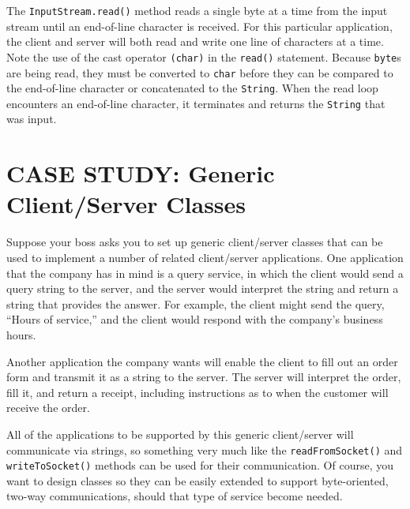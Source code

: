 {The {\tt InputStream.read()} method reads a single byte at a time from
the input stream until an end-of-line character is received.  For this
particular application, the client and server will both read and write
one line of characters at a time.  Note the use of the cast operator
{\tt (char)} in the {\tt read()} statement.   Because {\tt byte}s are
being read, they must be converted to {\tt char} before they can be
compared to the end-of-line character or concatenated to the
{\tt String}. When the read loop encounters an end-of-line character, it
terminates and returns the {\tt String} that was input.


\section{CASE STUDY: Generic Client/Server Classes}
\label{casestudy-generic-client-server-classes}
\label{sec-clientserver}\label{pg-sec-clientserver}
\noindent Suppose your boss asks you to set up generic client/server classes
that can be used to implement a number of related client/server
applications.  One application that the company has in mind is a query
service, in which the client would send a query string to the server,
and the server would interpret the string and return a string that
provides the answer.  For example, the client might send the query,
``Hours of service,'' and the client would respond with the company's
business hours.

Another application the company wants will enable the client to fill out an
order form and transmit it as a string to the server.  The server will
interpret the order, fill it, and return a receipt, including
instructions as to when the customer will receive the order.

All of the applications to be supported by this generic client/server
will communicate via strings, so something very much like the
{\tt readFromSocket()} and {\tt writeToSocket()} methods can be used for
their communication.  Of course, you want to design classes so they
can be easily extended to support byte-oriented, two-way
communications, should that type of service become needed.

}
